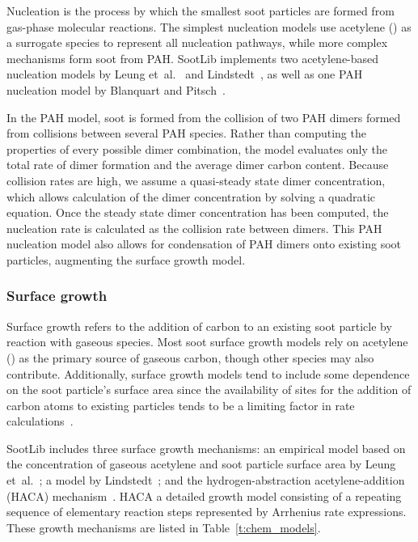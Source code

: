 \documentclass[preprint,letterpaper]{elsarticle}
\begin{document}
Nucleation is the process by which the smallest soot particles are formed from gas-phase molecular reactions.
The simplest nucleation models use acetylene () as a surrogate species to represent all nucleation pathways, while more complex mechanisms form soot from PAH. SootLib implements two acetylene-based nucleation models by Leung et~al.~\cite{Leung_1991} and Lindstedt~\cite{Lindstedt_2005}, as well as one PAH nucleation model by Blanquart and Pitsch~\cite{Blanquart_2009c}.

In the PAH model, soot is formed from the collision of two PAH dimers formed from collisions between several PAH species.
Rather than computing the properties of every possible dimer combination, the model evaluates only the total rate of dimer formation and the average dimer carbon content.
Because collision rates are high, we assume a quasi-steady state dimer concentration, which allows calculation of the dimer concentration by solving a quadratic equation.
Once the steady state dimer concentration has been computed, the nucleation rate is calculated as the collision rate between dimers.
This PAH nucleation model also allows for condensation of PAH dimers onto existing soot particles, augmenting the surface growth model.

\subsubsection{Surface growth}
\label{s:grw}

Surface growth refers to the addition of carbon to an existing soot particle by reaction with gaseous species. Most soot surface growth models rely on acetylene () as the primary source of gaseous carbon, though other species may also contribute. Additionally, surface growth models tend to include some dependence on the soot particle's surface area since the availability of sites for the addition of carbon atoms to existing particles tends to be a limiting factor in rate calculations~\cite{Wang_2011}.

SootLib includes three surface growth mechanisms: an empirical model based on the concentration of gaseous acetylene and soot particle surface area by Leung et~al.~\cite{Leung_1991}; a model by Lindstedt~\cite{Lindstedt_1994}; and the hydrogen-abstraction acetylene-addition (HACA) mechanism~\cite{Appel_2000}. HACA a detailed growth model consisting of a repeating sequence of elementary reaction steps represented by Arrhenius rate expressions. These growth mechanisms are listed in Table~\ref{t:chem_models}.
\end{document}
